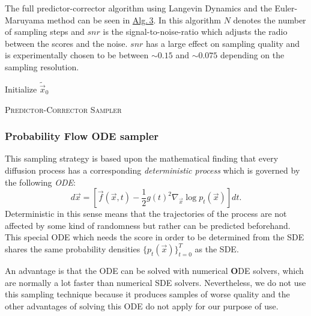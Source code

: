 The full predictor-corrector algorithm using Langevin Dynamics and the Euler-Maruyama method can be seen in \hyperref[alg:3]{Alg.\,3}. In this algorithm $N$ denotes the number of sampling steps and $snr$ is the signal-to-noise-ratio which adjusts the radio between the scores and the noise. $snr$ has a large effect on sampling quality and is experimentally chosen to be between $\sim0.15$ and $\sim0.075$ depending on the sampling resolution. 
%
\begin{algorithm} \label{alg:3}
    \DontPrintSemicolon
    Initialize $\tilde{\vec{x}}_0$\;

    
    \caption[Predictor-Corrector Sampler]{\textsc{Predictor-Corrector Sampler}}
\end{algorithm}
%
\subsubsection{Probability Flow ODE sampler}
%
This sampling strategy is based upon the mathematical finding that every diffusion process has a corresponding \textit{deterministic process} which is governed by the following \textit{ODE}:
%
\begin{equation} \label{equ:4.21}
    d\vec{x}=\left[\vec{f}(\vec{x},t)-\frac{1}{2}g(t)^2\nabla_{\vec{x}}\log p_t(\vec{x})\right]dt.
\end{equation}
%
Deterministic in this sense means that the trajectories of the process are not affected by some kind of randomness but rather can be predicted beforehand. This special ODE which needs the score in order to be determined from the SDE shares the same probability densities $\{p_t(\vec{x})\}_{t=0}^T$ as the SDE. 

An advantage is that the ODE can be solved with numerical \textbf{O}DE solvers, which are normally a lot faster than numerical SDE solvers. Nevertheless, we do not use this sampling technique because it produces samples of worse quality \cite{score_3} and the other advantages of solving this ODE do not apply for our purpose of use.
%
